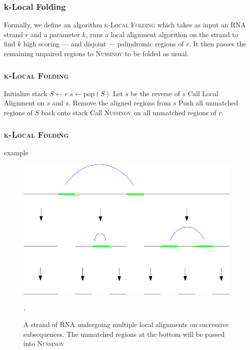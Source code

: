 \documentclass{beamer}
\newcommand{\klf}{\textsc{k-Local Folding} }
\newcommand{\rf}{\textsc{Nussinov} }
\begin{document}
\begin{frame}
\frametitle{k-Local Folding}
Formally, we define an algorithm \klf which takes as input an RNA strand $r$ and a parameter $k$, runs a local alignment algorithm on the strand to find $k$ high scoring --- and disjoint --- palindromic regions of $r$. It then passes the remaining unpaired regions to \rf to be folded as usual.
\end{frame}

\begin{frame}
\frametitle{\klf} 
\begin{algorithmic}[1]
\State Initialize stack $S\gets r$
\State $s\gets \text{pop}(S)$
\State Let $\overline{s}$ be the reverse of $s$
\State Call Local Alignment on $s$ and $\overline{s}$.
\State Remove the aligned regions from $s$
\State Push all unmatched regions of $S$ back onto stack
\EndIf 
\EndWhile
\State Call \rf on all unmatched regions of $r$. 
\EndProcedure
\end{algorithmic}
\end{frame}

\begin{frame}
\frametitle{\klf}
\begin{block}{example}
\begin{figure}
\centering
\includegraphics[scale=0.28]{images/k_local_sequence.png}
\caption{A strand of RNA undergoing multiple local alignments on successive subsequences. The unmatched regions at the bottom will be passed into \rf}. 
\end{figure}
\end{block}
\end{frame}
\end{document}
